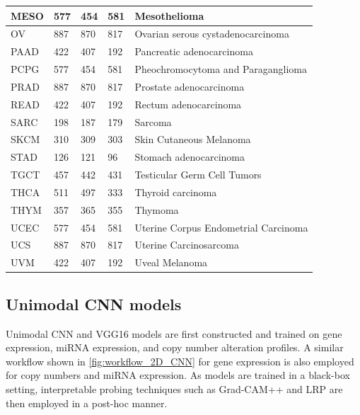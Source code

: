 \begin{table} [h]
\begin{tabular}{l|l|l|l|l}
            MESO & 577 & 454 & 581 & Mesothelioma \\\hline
            OV   & 887 & 870 & 817 & Ovarian serous cystadenocarcinoma  \\\hline
            PAAD & 422 & 407 & 192 & Pancreatic adenocarcinoma \\\hline
            PCPG   & 577 & 454 & 581 & Pheochromocytoma and Paraganglioma \\\hline
            PRAD & 887 & 870 & 817 & Prostate adenocarcinoma  \\\hline
            READ & 422 & 407 & 192 & Rectum adenocarcinoma \\\hline
            SARC & 198 & 187 & 179 & Sarcoma	\\\hline%
            SKCM & 310 & 309 & 303 & Skin Cutaneous Melanoma \\\hline 
            STAD & 126 & 121 & 96 & Stomach adenocarcinoma \\\hline 
            TGCT & 457 & 442 & 431 & Testicular Germ Cell Tumors  \\\hline
            THCA & 511 & 497 & 333 & Thyroid carcinoma \\\hline
            THYM & 357 & 365 & 355 & Thymoma \\\hline
            UCEC   & 577 & 454 & 581 & Uterine Corpus Endometrial Carcinoma \\\hline
            UCS & 887 & 870 & 817 & Uterine Carcinosarcoma  \\\hline
            UVM & 422 & 407 & 192 & Uveal Melanoma \\\hline
    \end{tabular}
    \vspace{-2mm}
\end{table}

\subsection{Unimodal CNN models}
Unimodal CNN and VGG16 models are first constructed and trained on gene expression, miRNA expression, and copy number alteration profiles. A similar workflow shown in \cref{fig:workflow_2D_CNN} for gene expression is also employed for copy numbers and miRNA expression. As models are trained in a black-box setting, interpretable probing techniques such as Grad-CAM++ and LRP are then employed in a post-hoc manner. 

